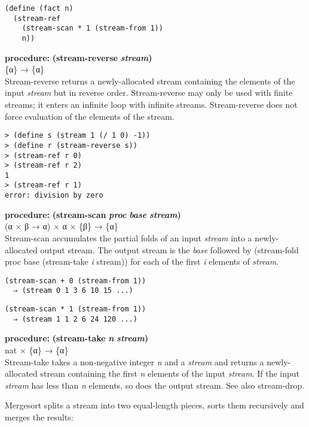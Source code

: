 \begin{verbatim}
(define (fact n)
  (stream-ref
    (stream-scan * 1 (stream-from 1))
    n))
\end{verbatim}

\textbf{procedure:} \textbf{(stream-reverse} \textbf{\emph{stream})}\\
\{α\} → \{α\}\\
Stream-reverse returns a newly-allocated stream containing the elements
of the input \emph{stream} but in reverse order. Stream-reverse may only
be used with finite streams; it enters an infinite loop with infinite
streams. Stream-reverse does not force evaluation of the elements of the
stream.

\begin{verbatim}
> (define s (stream 1 (/ 1 0) -1))
> (define r (stream-reverse s))
> (stream-ref r 0)
> (stream-ref r 2)
1
> (stream-ref r 1)
error: division by zero
\end{verbatim}

\textbf{procedure:} \textbf{(stream-scan} \textbf{\emph{proc}} \textbf{}
\textbf{\emph{base}} \textbf{} \textbf{\emph{stream})}\\
(α × β → α) × α × \{β\} → \{α\}\\
Stream-scan accumulates the partial folds of an input \emph{stream} into
a newly-allocated output stream. The output stream is the \emph{base}
followed by (stream-fold proc base (stream-take \emph{i} stream)) for
each of the first \emph{i} elements of \emph{stream}.

\begin{verbatim}
(stream-scan + 0 (stream-from 1))
  ⇒ (stream 0 1 3 6 10 15 ...)
\end{verbatim}

\begin{verbatim}
(stream-scan * 1 (stream-from 1))
  ⇒ (stream 1 1 2 6 24 120 ...)
\end{verbatim}

\textbf{procedure:} \textbf{(stream-take} \textbf{\emph{n}} \textbf{}
\textbf{\emph{stream})}\\
nat × \{α\} → \{α\}\\
Stream-take takes a non-negative integer \emph{n} and a \emph{stream}
and returns a newly-allocated stream containing the first \emph{n}
elements of the input \emph{stream}. If the input \emph{stream} has less
than \emph{n} elements, so does the output stream. See also stream-drop.

Mergesort splits a stream into two equal-length pieces, sorts them
recursively and merges the results:

